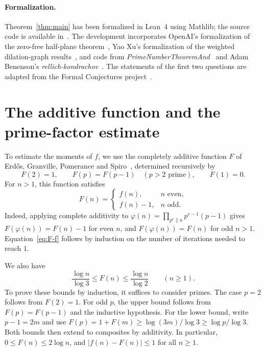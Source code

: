\documentclass[10pt]{article}
\begin{document}
\paragraph{Formalization.} Theorem~\ref{thm:main} has been formalized in Lean~4 using Mathlib; the source code is available in~\cite{Formalization}. The development incorporates OpenAI's formalization of the zero-free half-plane theorem~\cite{OAICode}, Yao Xu's formalization of the weighted dilation-graph results~\cite{TotientFibers}, and code from \emph{PrimeNumberTheoremAnd}~\cite{PNTCode} and Adam Benenson's \emph{rellich-kondrachov}~\cite{RellichKondrachov}. The statements of the first two questions are adapted from the Formal Conjectures project~\cite{FormalConjectures}.

\section{The additive function and the prime-factor estimate}
\label{sec:rectangle}

To estimate the moments of $f$, we use the completely additive function $F$ of Erd\H{o}s, Granville, Pomerance and Spiro~\cite[p.~166]{EGPS}, determined recursively by
\begin{equation}\label{eq:F}
 F(2)=1,\qquad F(p)=F(p-1)\quad(p>2\text{ prime}),\qquad F(1)=0.
\end{equation}
For $n>1$, this function satisfies
\begin{equation}\label{eq:F-f}
 F(n)=\begin{cases}f(n),&n\text{ even},\\ f(n)-1,&n\text{ odd}.
 \end{cases}
\end{equation}
Indeed, applying complete additivity to $\varphi(n)=\prod_{p^e\parallel n}p^{e-1}(p-1)$ gives $F(\varphi(n))=F(n)-1$ for even $n$, and $F(\varphi(n))=F(n)$ for odd $n>1$. Equation~\eqref{eq:F-f} follows by induction on the number of iterations needed to reach $1$.

We also have
\begin{equation}\label{eq:F-bounds}
 \frac{\log n}{\log 3}\leq F(n)\leq\frac{\log n}{\log 2}
 \qquad(n\geq1).
\end{equation}
To prove these bounds by induction, it suffices to consider primes. The case $p=2$ follows from $F(2)=1$. For odd $p$, the upper bound follows from $F(p)=F(p-1)$ and the inductive hypothesis. For the lower bound, write $p-1=2m$ and use $F(p)=1+F(m)\geq\log(3m)/\log 3\geq\log p/\log 3$. Both bounds then extend to composites by additivity. In particular, $0\leq F(n)\leq2\log n$, and $|f(n)-F(n)|\leq1$ for all $n\geq1$.
\end{document}
